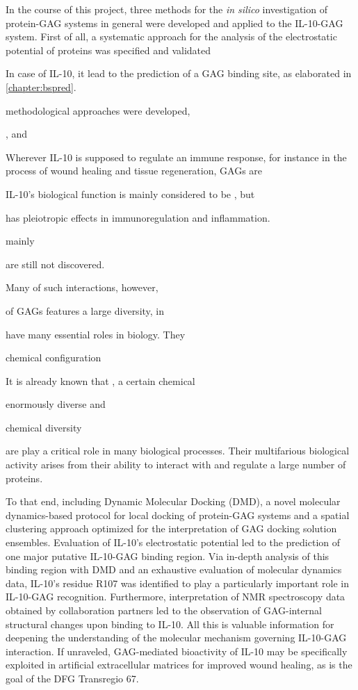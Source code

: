 In the course of this project, three methods for the \textit{in silico}
investigation of protein-GAG systems in general were developed and applied to
the IL-10-GAG system. First of all, a systematic approach for the analysis of
the electrostatic potential of proteins was specified and validated

In case of IL-10, it lead to the prediction of a GAG binding site, as elaborated
in \cref{chapter:bspred}.

methodological approaches were developed,

, and



Wherever IL-10 is supposed to
regulate an immune response, for instance in the process of wound healing and
tissue regeneration, GAGs are


 IL-10's biological function is mainly considered to be
, but

 has pleiotropic effects in immunoregulation and
inflammation.




mainly








are still
not discovered.


Many of such interactions, however,




of GAGs features a
large diversity, in


have many essential roles in biology. They

 chemical
configuration


It is already known that , a certain chemical




enormously diverse and

chemical diversity







are play a critical role in many biological processes.
Their multifarious biological activity arises from their ability to interact
with and regulate a large number of proteins.

  To that end, including Dynamic Molecular Docking
(DMD), a novel molecular dynamics-based protocol for local docking of
protein-GAG systems and a spatial clustering approach optimized for the
interpretation of GAG docking solution ensembles. Evaluation of IL-10's
electrostatic potential led to the prediction of one major putative IL-10-GAG
binding region. Via in-depth analysis of this binding region with DMD and an
exhaustive evaluation of molecular dynamics data, IL-10's residue R107 was
identified to play a particularly important role in IL-10-GAG recognition.
Furthermore, interpretation of NMR spectroscopy data obtained by collaboration
partners led to the observation of GAG-internal structural changes upon binding
to IL-10. All this is valuable information for deepening the understanding of
the molecular mechanism governing IL-10-GAG interaction. If unraveled,
GAG-mediated bioactivity of IL-10 may be specifically exploited in artificial
extracellular matrices for improved wound healing, as is the goal of the DFG
Transregio 67.

\lipsum[1-4]